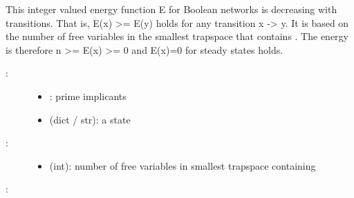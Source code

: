 \documentclass[letterpaper,10pt,english]{sphinxmanual}
\begin{document}
\begin{fulllineitems}
\label{\detokenize{StateTransitionGraphs:PyBoolNet.StateTransitionGraphs.energy}}
This integer valued energy function E for Boolean networks is decreasing with transitions.
That is, E(x) \textgreater{}= E(y) holds for any transition x -\textgreater{} y.
It is based on the number of free variables in the smallest trapspace that contains .
The energy is therefore n \textgreater{}= E(x) \textgreater{}= 0 and E(x)=0 for steady states holds.
\begin{description}
\item[{:}] \leavevmode\begin{itemize}
\item {} 
: prime implicants

\item {} 
 (dict / str): a state

\end{itemize}

\item[{:}] \leavevmode\begin{itemize}
\item {} 
 (int): number of free variables in smallest trapspace containing 

\end{itemize}

\end{description}

:

\begin{sphinxVerbatim}[commandchars=\\\{\}]
  
 
 
 
\end{sphinxVerbatim}

\end{fulllineitems}
\end{document}
